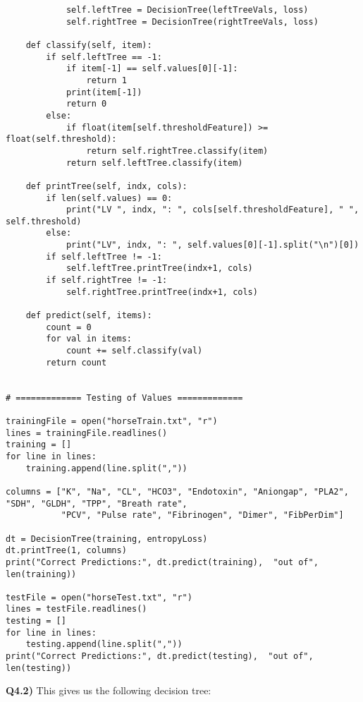 \documentclass{article}
\begin{document}
\begin{titlepage}
\begin{lstlisting}
            self.leftTree = DecisionTree(leftTreeVals, loss)
            self.rightTree = DecisionTree(rightTreeVals, loss)

    def classify(self, item):
        if self.leftTree == -1:
            if item[-1] == self.values[0][-1]:
                return 1
            print(item[-1])
            return 0
        else:
            if float(item[self.thresholdFeature]) >= float(self.threshold):
                return self.rightTree.classify(item)
            return self.leftTree.classify(item)

    def printTree(self, indx, cols):
        if len(self.values) == 0:
            print("LV ", indx, ": ", cols[self.thresholdFeature], " ", self.threshold)
        else:
            print("LV", indx, ": ", self.values[0][-1].split("\n")[0])
        if self.leftTree != -1:
            self.leftTree.printTree(indx+1, cols)
        if self.rightTree != -1:
            self.rightTree.printTree(indx+1, cols)

    def predict(self, items):
        count = 0
        for val in items:
            count += self.classify(val)
        return count


# ============= Testing of Values =============

trainingFile = open("horseTrain.txt", "r")
lines = trainingFile.readlines()
training = []
for line in lines:
    training.append(line.split(","))

columns = ["K", "Na", "CL", "HCO3", "Endotoxin", "Aniongap", "PLA2", "SDH", "GLDH", "TPP", "Breath rate",
           "PCV", "Pulse rate", "Fibrinogen", "Dimer", "FibPerDim"]

dt = DecisionTree(training, entropyLoss)
dt.printTree(1, columns)
print("Correct Predictions:", dt.predict(training),  "out of", len(training))

testFile = open("horseTest.txt", "r")
lines = testFile.readlines()
testing = []
for line in lines:
    testing.append(line.split(","))
print("Correct Predictions:", dt.predict(testing),  "out of", len(testing))
\end{lstlisting}
\textbf{Q4.2)} This gives us the following decision tree:\\\\

\end{titlepage}
\end{document}
